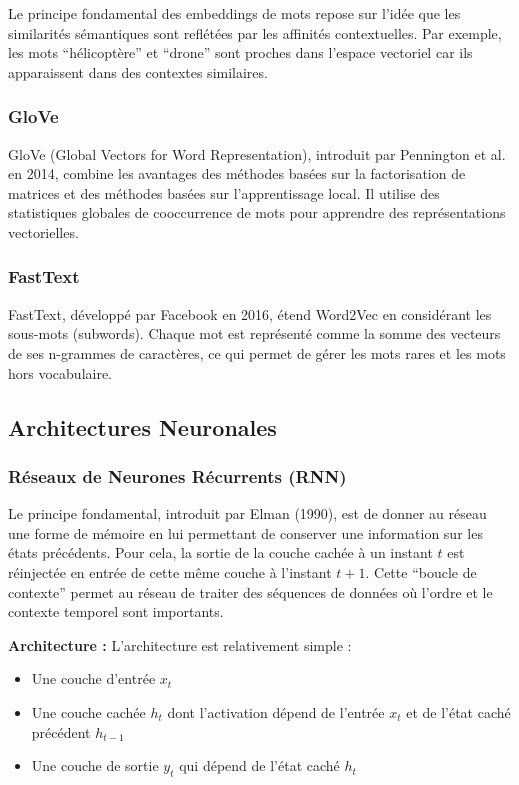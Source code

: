 Le principe fondamental des embeddings de mots repose sur l'idée que les similarités sémantiques sont reflétées par les affinités contextuelles. Par exemple, les mots \enquote{hélicoptère} et \enquote{drone} sont proches dans l'espace vectoriel car ils apparaissent dans des contextes similaires.

\subsubsection{GloVe}

GloVe (Global Vectors for Word Representation), introduit par Pennington et al. en 2014, combine les avantages des méthodes basées sur la factorisation de matrices et des méthodes basées sur l'apprentissage local. Il utilise des statistiques globales de cooccurrence de mots pour apprendre des représentations vectorielles.

\subsubsection{FastText}

FastText, développé par Facebook en 2016, étend Word2Vec en considérant les sous-mots (subwords). Chaque mot est représenté comme la somme des vecteurs de ses n-grammes de caractères, ce qui permet de gérer les mots rares et les mots hors vocabulaire.

\subsection{Architectures Neuronales}

\subsubsection{Réseaux de Neurones Récurrents (RNN)}

Le principe fondamental, introduit par Elman (1990), est de donner au réseau une forme de mémoire en lui permettant de conserver une information sur les états précédents. Pour cela, la sortie de la couche cachée à un instant $t$ est réinjectée en entrée de cette même couche à l'instant $t+1$. Cette \enquote{boucle de contexte} permet au réseau de traiter des séquences de données où l'ordre et le contexte temporel sont importants.

\textbf{Architecture :}
L'architecture est relativement simple :
\begin{itemize}
    \item Une couche d'entrée $x_t$
    \item Une couche cachée $h_t$ dont l'activation dépend de l'entrée $x_t$ et de l'état caché précédent $h_{t-1}$
    \item Une couche de sortie $y_t$ qui dépend de l'état caché $h_t$
\end{itemize}

